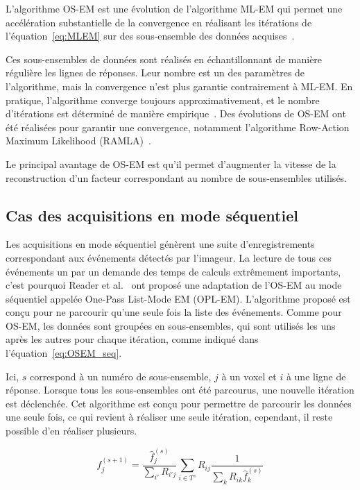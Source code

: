 L'algorithme OS-EM est une évolution de l'algorithme ML-EM  qui permet une accélération substantielle de la convergence en réalisant les itérations de l'équation~\ref{eq:MLEM} sur des sous-ensemble des données acquises~\cite{hudson1994accelerated}. 

Ces sous-ensembles de données sont réalisés en échantillonnant de manière régulière les lignes de réponses. Leur nombre est un des paramètres de l'algorithme, mais la convergence n'est plus garantie contrairement à ML-EM. En pratique, l'algorithme converge toujours approximativement, et le nombre d'itérations est déterminé de manière empirique~\cite{bailey2005positon}. Des évolutions de OS-EM ont été réalisées pour garantir une convergence, notamment l'algorithme Row-Action Maximum Likelihood (RAMLA)~\cite{browne1996row, chiang2004clinical}.

Le principal avantage de OS-EM est qu'il permet d'augmenter la vitesse de la reconstruction d'un facteur correspondant au nombre de sous-ensembles utilisés.

	\subsection{Cas des acquisitions en mode séquentiel}
\label{lab:OPLEM}

Les acquisitions en mode séquentiel génèrent une suite d'enregistrements correspondant aux événements détectés par l'imageur. La lecture de tous ces événements un par un demande des temps de calculs extrêmement importants, c'est pourquoi Reader et al.~\cite{reader2002one} ont proposé une adaptation de l'OS-EM au mode séquentiel appelée One-Pass List-Mode EM (OPL-EM). L'algorithme proposé est conçu pour ne parcourir qu'une seule fois la liste des événements. Comme pour OS-EM, les données sont groupées en sous-ensembles, qui sont utilisés les uns après les autres pour chaque itération, comme indiqué dans l'équation~\ref{eq:OSEM_seq}.

Ici, $s$ correspond à un numéro de sous-ensemble, $j$ à un voxel et $i$ à une ligne de réponse. Lorsque tous les sous-ensembles ont été parcourus, une nouvelle itération est déclenchée. Cet algorithme est conçu pour permettre de parcourir les données une seule fois, ce qui revient à réaliser une seule itération, cependant, il reste possible d'en réaliser plusieurs.

\begin{equation}
	f_j^{(s+1)}=\frac{\hat{f}_j^{(s)}}{\sum\limits_{i'}R_{i'j}}\sum\limits_{i \in T^s}R_{ij}\frac{1}{\sum\limits_{k}R_{ik}\hat{f}_k^{(s)}}
\label{eq:OSEM_seq}
\end{equation}

